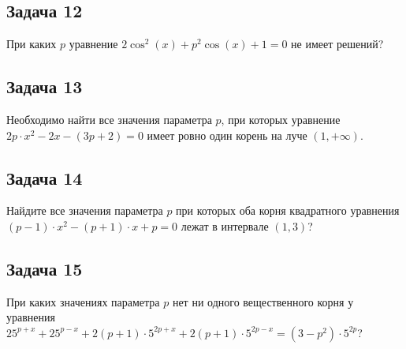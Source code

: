 \subsection * {Задача 12}
При каких $p$ уравнение $2\cos^2{(x)} + p^2 \cos{(x)} + 1 = 0$ не имеет решений?\\

\subsection * {Задача 13}
Необходимо найти все значения параметра $p$, при которых уравнение
$2p \cdot x^2 - 2x - (3p + 2)=0$ имеет ровно один корень на луче $(1, +\infty)$.\\

\subsection * {Задача 14}
Найдите все значения параметра $p$ при которых оба корня квадратного уравнения
$(p - 1) \cdot x^2 - (p + 1) \cdot x + p = 0$ лежат в интервале $(1, 3)$?\\

\subsection * {Задача 15}
При каких значениях параметра $p$ нет ни одного вещественного корня у уравнения 
$25^{p+x}+25^{p-x}+2(p+1)\cdot5^{2p+x}+2(p+1)\cdot5^{2p-x}= (3-p^2)\cdot5^{2p}$?\\